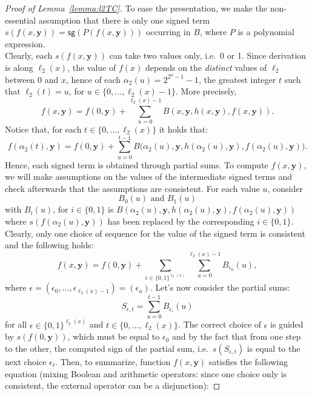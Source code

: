\documentclass[11pt, oneside]{article}
\newcommand{\fun}[1]{\mathsf{#1}}
\newcommand{\tu}[1]{\mathbf{#1}}
\theoremstyle{definition}
\begin{document}
\begin{toappendix}
    \begin{proof}[Proof of Lemma~\ref{lemma:l2TC}]
        To ease the presentation, we make the non-essential assumption that there is only one signed term $s(f(x, \tu y))=\fun{sg}(P(f(x, \tu y)))$ occurring in $B$, where $P$ is a polynomial expression.
        \\
        Clearly, each $s(f(x, \tu y))$ can take two values only, i.e.~0 or 1.
        Since derivation is along $\ell_2(x)$, the value of $f(x)$ depends on the \emph{distinct} values of $\ell_2$ between 0 and $x$, hence of each $\alpha_2(u)=2^{2^u-1}-1$, the greatest integer $t$ such that $\ell_2(t)=u$, for $u\in \{0,\dots, \ell_2(x)-1\}$.
        More precisely, 
        $$
            f(x, \tu y) = f(0, \tu y) + \sum^{\ell_2(x)-1}_{u=0} B(x, \tu y, h(x, \tu y), f(x, \tu y)).
        $$
        Notice that, for each $t\in \{0,\dots, \ell_2(x)\}$ it holds that:
        $$
             f(\alpha_2(t), \tu y) = f(0, \tu y) + \sum^{t-1}_{u=0} B\big(\alpha_2(u), \tu y, h(\alpha_2(u), \tu y), f(\alpha_2(u), \tu y)\big).
        $$
        Hence, each signed term is obtained through partial sums.
        To compute $f(x, \tu y)$, we will make assumptions on the values of the intermediate signed terms and check afterwards that the assumptions are consistent.
        For each value $u$, consider
        $$
            B_0(u) \text{ and } B_1(u)
        $$
        with $B_i(u)$, for $i\in \{0,1\}$ is $B(\alpha_2(u), \tu y, h(\alpha_2(u), \tu y), f(\alpha_2(u), \tu y))$ where $s(f(\alpha_2(u), \tu y))$ has been replaced by the corresponding $i\in \{0, 1\}$.
        \\
        Clearly, only one choice of sequence for the value of the signed term is consistent and the following holds:
        $$
        f(x, \tu y) = f(0, \tu y) + \sum_{\epsilon \in \{0,1\}^{\ell_2(x)}} \sum^{\ell_2(x)-1}_{u=0} B_{\epsilon_u}(u),
        $$
        where $\epsilon = (\epsilon_0, \dots, \epsilon_{\ell_2(x)-1})=(\epsilon_u)$.
        Let's now consider the partial sums:
        $$
        S_{\epsilon, t} = \sum^{t-1}_{u=0} B_{\epsilon_i}(u)
        $$
        for all $\epsilon \in \{0,1\}^{\ell_2(x)}$ and $t\in \{0,\dots, \ell_2(x)\}$.
        The correct choice of $\epsilon$ is guided by $s(f(0, \tu y))$, which must be equal to $\epsilon_0$ and by the fact that from one step to the other, the computed sign of the partial sum, i.e.~$s(S_{\epsilon,t})$ is equal to the next choice $\epsilon_t$.
        Then, to summarize, function $f(x, \tu y)$ satisfies the following equation (mixing Boolean and arithmetic operators: since one choice only is consistent, the external operator can be a disjunction):

\end{proof}
\end{toappendix}
\end{document}
